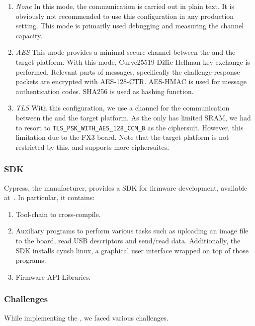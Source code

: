 \begin{enumerate}
  \item \emph{None} In this mode, the communication is carried out in plain text. It is obviously not recommended to use this configuration in any production setting. This mode is primarily used debugging and measuring the channel capacity.
  \item \emph{AES} This mode provides a minimal secure channel between the \device and the target platform. With this mode, Curve25519 Diffie-Hellman key exchange is performed. Relevant parts of messages, specifically the challenge-response packets are encrypted with AES-128-CTR. AES-HMAC is used for message authentication codes. SHA256 is used as hashing function.
  \item \emph{TLS} With this configuration, we use a \tls channel for the communication between the \device and the target platform. As the \device only has limited SRAM, we had to resort to \texttt{TLS\_PSK\_WITH\_AES\_128\_CCM\_8} as the ciphersuit. However, this limitation due to the FX3 board. Note that the target platform is not restricted by this, and supports more ciphersuites. 
\end{enumerate}


\subsubsection{SDK} Cypress, the manufacturer, provides a SDK for firmware development, available at~\cite{fx3_sdk}. In particular, it contains:

\begin{enumerate}
  \item Tool-chain to cross-compile.
  \item Auxiliary programs to perform various tasks such as uploading an image file to the board, read USB descriptors and send/read data. Additionally, the SDK installs cyusb linux, a graphical user interface wrapped on top of those programs.
  \item Firmware API Libraries.  
 \end{enumerate}
  
\subsubsection{Challenges} While implementing the \device, we faced various challenges.

